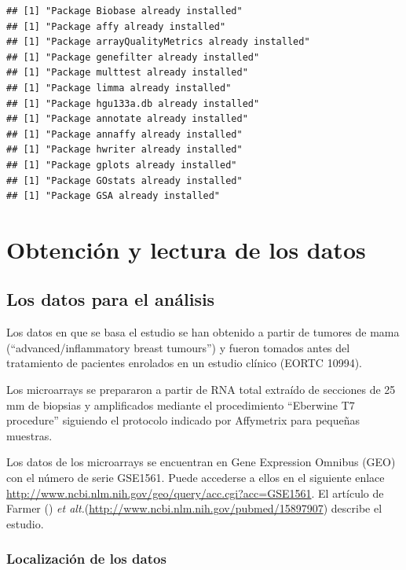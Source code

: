 \documentclass[a4paper]{article}\usepackage[]{graphicx}\usepackage[]{color}
\makeatletter
\newenvironment{kframe}{%
 \def\at@end@of@kframe{}%
 \ifinner\ifhmode%
  \def\at@end@of@kframe{\end{minipage}}%
  \begin{minipage}{\columnwidth}%
 \fi\fi%
 \def\FrameCommand##1{\hskip\@totalleftmargin \hskip-\fboxsep
 \colorbox{shadecolor}{##1}\hskip-\fboxsep
     \hskip-\linewidth \hskip-\@totalleftmargin \hskip\columnwidth}%
 \MakeFramed {\advance\hsize-\width
   \@totalleftmargin\z@ \linewidth\hsize
   \@setminipage}}%
 {\par\unskip\endMakeFramed%
 \at@end@of@kframe}
\newenvironment{knitrout}{}{} %
\newcommand{\etal}{{\it et alt.}}
\makeatother
\begin{document}
\begin{knitrout}
\color{fgcolor}\begin{kframe}
\begin{verbatim}
## [1] "Package Biobase already installed"
## [1] "Package affy already installed"
## [1] "Package arrayQualityMetrics already installed"
## [1] "Package genefilter already installed"
## [1] "Package multtest already installed"
## [1] "Package limma already installed"
## [1] "Package hgu133a.db already installed"
## [1] "Package annotate already installed"
## [1] "Package annaffy already installed"
## [1] "Package hwriter already installed"
## [1] "Package gplots already installed"
## [1] "Package GOstats already installed"
## [1] "Package GSA already installed"
\end{verbatim}
\end{kframe}
\end{knitrout}


\section{Obtención y lectura de los datos}

\subsection{Los datos para el análisis}

Los datos en que se basa el estudio se han obtenido a partir de tumores de mama (``advanced/inflammatory breast tumours'') y fueron tomados antes del tratamiento de pacientes enrolados en un estudio clínico (EORTC 10994). 

Los microarrays se prepararon a partir de RNA total extraído de secciones de 25 mm de biopsias y amplificados mediante el procedimiento ``Eberwine T7 procedure'' siguiendo el protocolo indicado por Affymetrix para pequeñas muestras.

Los datos de los microarrays se encuentran en Gene Expression Omnibus (GEO) con el número de serie GSE1561. Puede accederse a ellos  en el siguiente enlace \url{http://www.ncbi.nlm.nih.gov/geo/query/acc.cgi?acc=GSE1561}. El artículo de Farmer (\cite{Farmer2005}) \etal (\url{http://www.ncbi.nlm.nih.gov/pubmed/15897907}) describe el estudio.

\subsubsection{Localización de los datos}
\end{document}
